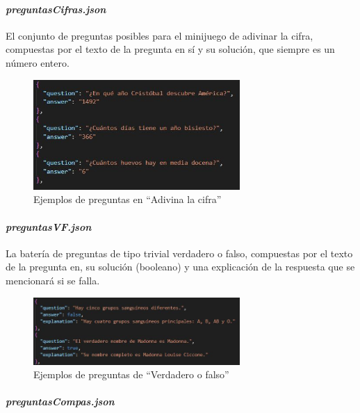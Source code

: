 \paragraph{\textit{preguntasCifras.json}}

El conjunto de preguntas posibles para el minijuego de adivinar la cifra, compuestas por el texto de la pregunta en sí y su solución, que siempre es un número entero.

\begin{figure}[H]
	\centering
	\includegraphics[width=0.7\textwidth]{imgs/exp-cifras.jpg}
	\caption{Ejemplos de preguntas en \enquote{Adivina la cifra}}
	\label{fig:exp-cifras}
\end{figure}

\newpage
\paragraph{\textit{preguntasVF.json}}

La batería de preguntas de tipo trivial verdadero o falso, compuestas por el texto de la pregunta en, su solución (booleano) y una explicación de la respuesta que se mencionará si se falla.

\begin{figure}[H]
	\centering
	\includegraphics[width=0.7\textwidth]{imgs/exp-vyf.jpg}
	\caption{Ejemplos de preguntas de \enquote{Verdadero o falso}}
	\label{fig:exp-vyf}
\end{figure}

\paragraph{\textit{preguntasCompas.json}}

